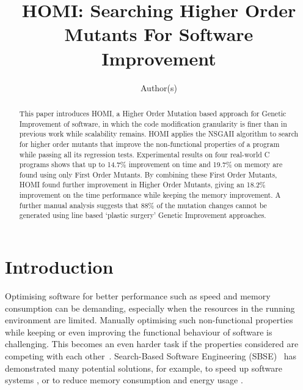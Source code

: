 \documentclass[oribibl]{llncs}
\begin{document}
\title{HOMI: Searching Higher Order Mutants For Software Improvement}

\author{Author(s)
}



\maketitle

\begin{abstract}

This paper introduces HOMI, a Higher Order Mutation based approach for Genetic Improvement of software,
in which the code modification granularity is finer than in previous work while scalability remains.
HOMI applies the NSGAII algorithm to search for higher order mutants that improve the non-functional properties of a program while passing all its regression tests.
Experimental results on four real-world C programs shows
that up to 14.7\% improvement on time and 19.7\% on memory are found using only First Order Mutants.
By combining these First Order Mutants, HOMI found further improvement in Higher Order Mutants, giving an 18.2\% improvement on the time performance while keeping the memory improvement.
A further manual analysis suggests that 88\% of the mutation changes cannot be generated using line based `plastic surgery' Genetic Improvement approaches.
\end{abstract}

\section{Introduction}
\label{sec_intro}

Optimising software for better performance such as speed and memory consumption can be demanding, especially when the resources in the running environment are limited.
Manually optimising such non-functional properties while keeping or even improving the functional behaviour of software is challenging. This becomes an even harder task if the properties considered are competing with each other~\cite{Harman:2012:GCC:2351676.2351678}. Search-Based Software Engineering (SBSE)~\cite{Harman2001833} has demonstrated many potential solutions, for example, to speed up software systems \cite{5688317, Langdon:2014:IMI:2576768.2598244}, or to reduce memory consumption \cite{Wu:2015:DPO:2739480.2754648} and energy usage \cite{Bruce:2015:REC:2739480.2754752}.
\end{document}
